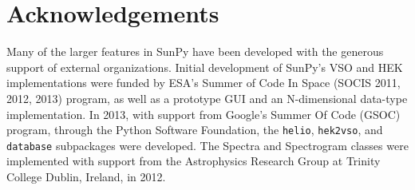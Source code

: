\section{Acknowledgements}
Many of the larger features in SunPy have been developed with the generous support of 
external organizations. 
Initial development of SunPy's VSO and HEK implementations were funded by ESA's 
Summer of Code In Space (SOCIS 2011, 2012, 2013) program, as well as a prototype GUI and an
N-dimensional data-type implementation. In 2013, with support from Google's 
Summer Of Code (GSOC) program, through the Python Software Foundation, the 
\texttt{helio}, \texttt{hek2vso}, and \texttt{database} subpackages were 
developed. The Spectra and Spectrogram classes were implemented with support 
from the Astrophysics Research Group at Trinity College Dublin, Ireland, in 
2012.